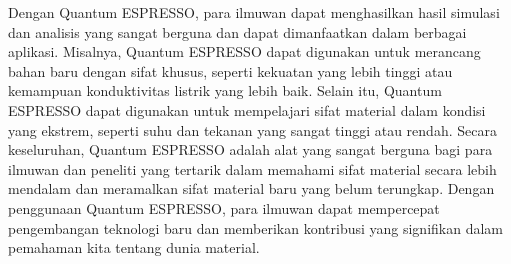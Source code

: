 Dengan Quantum ESPRESSO, para ilmuwan dapat menghasilkan hasil simulasi dan analisis yang sangat berguna dan dapat dimanfaatkan dalam berbagai aplikasi. Misalnya, Quantum ESPRESSO dapat digunakan untuk merancang bahan baru dengan sifat khusus, seperti kekuatan yang lebih tinggi atau kemampuan konduktivitas listrik yang lebih baik. Selain itu, Quantum ESPRESSO dapat digunakan untuk mempelajari sifat material dalam kondisi yang ekstrem, seperti suhu dan tekanan yang sangat tinggi atau rendah. Secara keseluruhan, Quantum ESPRESSO adalah alat yang sangat berguna bagi para ilmuwan dan peneliti yang tertarik dalam memahami sifat material secara lebih mendalam dan meramalkan sifat material baru yang belum terungkap. Dengan penggunaan Quantum ESPRESSO, para ilmuwan dapat mempercepat pengembangan teknologi baru dan memberikan kontribusi yang signifikan dalam pemahaman kita tentang dunia material. 




\newpage
